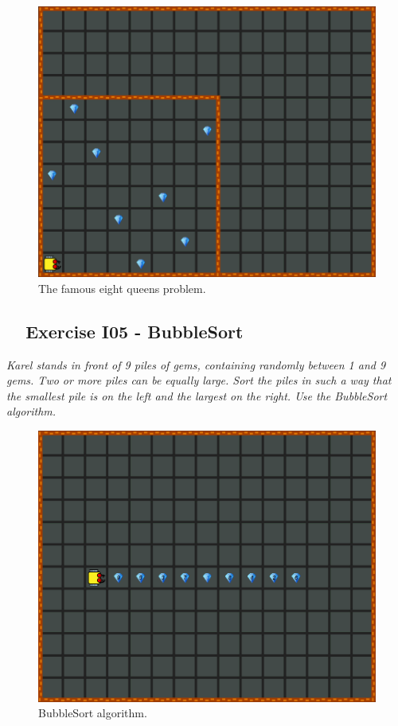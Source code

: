 {{{{\newpage
\begin{figure}[!ht]
\begin{center}
\includegraphics[height=0.4\textwidth]{imgk/i04.png}
\end{center}
\vspace{-4mm}
\caption{The famous eight queens problem.}
\label{fig:g14}
\vspace{-4mm}
\end{figure}
\noindent

\subsection{\ \ Exercise I05 - BubbleSort}

{\em Karel stands in front of 9 piles of gems, containing randomly between 1 and 9 gems. Two or more piles can 
be equally large. Sort the piles in such a way that the smallest pile is on the left and the largest on the 
right. Use the BubbleSort algorithm.}

\begin{figure}[!ht]
\begin{center}
\includegraphics[height=0.4\textwidth]{imgk/i05.png}
\end{center}
\vspace{-4mm}
\caption{BubbleSort algorithm.}
\label{fig:g13}
\vspace{-4mm}
\end{figure}
\noindent


}}}}
